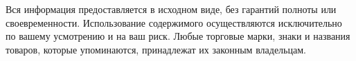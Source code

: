 \documentclass[a4paper,14pt]{report}
\begin{document}

\graphicspath{{img/}}



\pagestyle{fancy}
\fancyhead[CO,CE]{}
\fancyfoot[C]{\thepage}



                                            \clearpage
                                            \newpage

\listoffigures                             %




\newpage
\thispagestyle{empty}

\vspace{150mm}

{\tiny Вся информация предоставляется в исходном виде, без гарантий полноты или своевременности. Использование содержимого осуществляются исключительно по вашему усмотрению и на ваш риск. Любые торговые марки, знаки и названия товаров, которые упоминаются, принадлежат их законным владельцам.}
\end{document}
